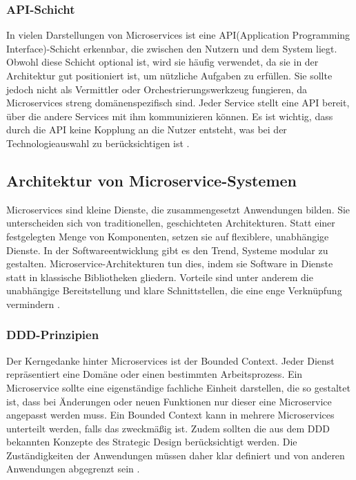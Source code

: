 {\subsubsection{API-Schicht}

In vielen Darstellungen von Microservices ist eine API(Application Programming Interface)-Schicht erkennbar, die zwischen den Nutzern und dem System liegt. Obwohl diese Schicht optional ist, wird sie häufig verwendet, da sie in der Architektur gut positioniert ist, um nützliche Aufgaben zu erfüllen. Sie sollte jedoch nicht als Vermittler oder Orchestrierungswerkzeug fungieren, da Microservices streng domänenspezifisch sind. Jeder Service stellt eine API bereit, über die andere Services mit ihm kommunizieren können. Es ist wichtig, dass durch die API keine Kopplung an die Nutzer entsteht, was bei der Technologieauswahl zu berücksichtigen ist \cite[S.255,256]{richards} \cite[S.24]{newman}.

\pagebreak
\subsection{Architektur von Microservice-Systemen}

Microservices sind kleine Dienste, die zusammengesetzt Anwendungen bilden. Sie unterscheiden sich von traditionellen, geschichteten Architekturen. Statt einer festgelegten Menge von Komponenten, setzen sie auf flexiblere, unabhängige Dienste. In der Softwareentwicklung gibt es den Trend, Systeme modular zu gestalten. Microservice-Architekturen tun dies, indem sie Software in Dienste statt in klassische Bibliotheken gliedern. Vorteile sind unter anderem die unabhängige Bereitstellung und klare Schnittstellen, die eine enge Verknüpfung vermindern \cite[S.154-157]{sommerville} \cite{fowlerlewis}.

\subsubsection{DDD-Prinzipien}

Der Kerngedanke hinter Microservices ist der Bounded Context. Jeder Dienst repräsentiert eine Domäne oder einen bestimmten Arbeitsprozess. Ein Microservice sollte eine eigenständige fachliche Einheit darstellen, die so gestaltet ist, dass bei Änderungen oder neuen Funktionen nur dieser eine Microservice angepasst werden muss. Ein Bounded Context kann in mehrere Microservices unterteilt werden, falls das zweckmäßig ist. Zudem sollten die aus dem DDD bekannten Konzepte des Strategic Design berücksichtigt werden. Die Zuständigkeiten der Anwendungen müssen daher klar definiert und von anderen Anwendungen abgegrenzt sein \cite[S.253,254]{richards} \cite[S. 48-51]{wolff} \cite[S.289]{daschner}.

}
